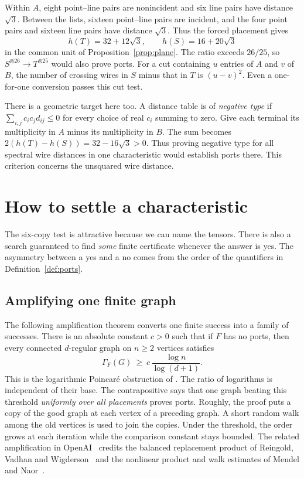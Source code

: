 \documentclass[11pt]{article}
\theoremstyle{definition}
\newcommand{\res}{\longrightarrow}
\begin{document}
Within \(A\), eight point--line pairs are nonincident and six line pairs
have distance \(\sqrt3\). Between the lists, sixteen point--line pairs are
incident, and the four point pairs and sixteen line pairs have distance
\(\sqrt3\). Thus the forced placement gives
\[
            h(T)=32+12\sqrt3,\qquad h(S)=16+20\sqrt3
\]
in the common unit of Proposition~\ref{prop:plane}. The ratio exceeds
\(26/25\), so \(S^{\otimes26}\res T^{\otimes25}\) would also prove ports.
For a cut containing \(u\) entries of \(A\) and \(v\) of \(B\), the
number of crossing wires in \(S\) minus that in \(T\) is \((u-v)^2\).
Even a one-for-one conversion passes this cut test.

There is a geometric target here too. A distance table is of
\emph{negative type} if \(\sum_{i,j}c_i c_j d_{ij}\le0\) for every choice
of real \(c_i\) summing to zero. Give each terminal its multiplicity in
\(A\) minus its multiplicity in \(B\). The sum becomes
\(2(h(T)-h(S))=32-16\sqrt3>0\). Thus proving negative type
for all spectral wire distances in one characteristic would establish
ports there. This criterion concerns the unsquared wire distance.

\section{How to settle a characteristic}
\label{sec:decide}

The six-copy test is attractive because we can name the tensors. There
is also a search guaranteed to find \emph{some} finite certificate whenever
the answer is yes. The asymmetry between a yes and a no comes from the
order of the quantifiers in Definition~\ref{def:ports}.

\subsection{Amplifying one finite graph}

The following amplification theorem converts one finite success into a
family of successes. There is an absolute constant \(c>0\) such that if
\(F\) has no ports, then every connected \(d\)-regular graph on \(n\ge2\)
vertices satisfies
\begin{equation}
                 \Gamma_F(G)\ \ge\ c\,\frac{\log n}{\log(d+1)} .
                 \label{eq:log}
\end{equation}
This is the logarithmic Poincar\'e obstruction of \cite{circuits}. The
ratio of logarithms is independent of their base. The contrapositive says
that one graph beating this threshold \emph{uniformly over all placements}
proves ports. Roughly, the proof puts a copy of the good graph at each
vertex of a preceding graph. A short random walk among the old vertices
is used to join the copies. Under the threshold, the order grows at
each iteration while the comparison constant stays bounded. The related amplification in OpenAI~\cite[Section~11.1]{euclid} credits the balanced replacement product of Reingold, Vadhan and Wigderson~\cite[Definition~6.6]{rvw-zigzag} and the nonlinear product and walk estimates of Mendel and Naor~\cite[Theorem~1.13(V) and Section~8]{mn-nonlinear}\cite[Corollary~1.9]{mn-spectral}\cite[Theorem~3.4]{mendel}.
\end{document}
